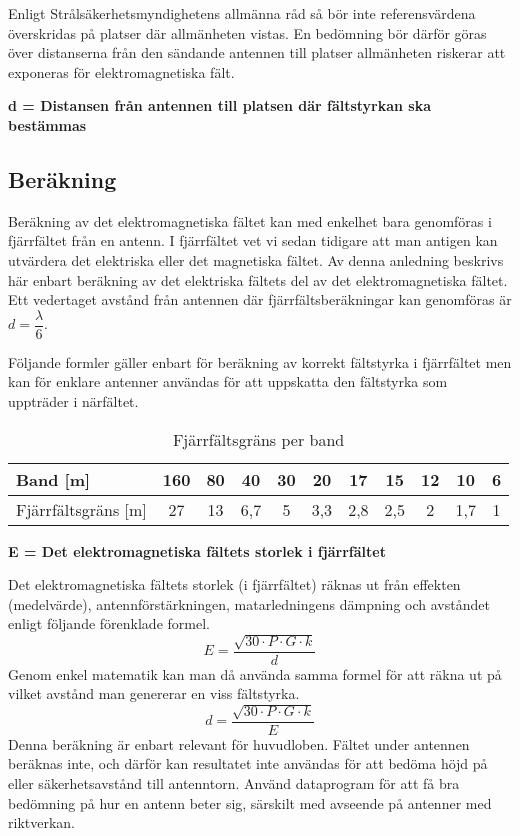 Enligt Strålsäkerhetsmyndighetens allmänna råd så bör inte referensvärdena
överskridas på platser där allmänheten vistas.
En bedömning bör därför göras över distanserna från den sändande antennen till
platser allmänheten riskerar att exponeras för elektromagnetiska fält.

\noindent\textbf{d = Distansen från antennen till platsen där fältstyrkan ska bestämmas}

\subsection{Beräkning}

Beräkning av det elektromagnetiska fältet kan med enkelhet bara
genomföras i fjärrfältet från en antenn.
I fjärrfältet vet vi sedan tidigare att man antigen kan utvärdera det
elektriska eller det magnetiska fältet.
Av denna anledning beskrivs här enbart beräkning av det elektriska fältets del av
det elektromagnetiska fältet.
Ett vedertaget avstånd från antennen där fjärrfältsberäkningar kan genomföras
är \(d=\dfrac{\lambda}{6}\).

Följande formler gäller enbart för beräkning av korrekt fältstyrka i
fjärrfältet men kan för enklare antenner användas för att uppskatta den
fältstyrka som uppträder i närfältet.

\begin{table*}[h]
  \begin{center}
    \begin{tabular}{|l|c|c|c|c|c|c|c|c|c|c|}
	\hline
	Band [m] & 160 & 80 & 40 & 30 & 20 & 17 & 15 & 12 & 10 & 6 \\ \hline
	Fjärrfältsgräns [m] & 27 & 13 & 6,7 & 5 & 3,3 & 2,8 & 2,5 & 2 & 1,7 & 1 \\ \hline
    \end{tabular}
    \caption{Fjärrfältsgräns per band}
    \label{tab:fjfltgr}
  \end{center}
\end{table*}

\noindent\textbf{E = Det elektromagnetiska fältets storlek i fjärrfältet}

Det elektromagnetiska fältets storlek (i fjärrfältet) räknas ut från
effekten (medelvärde), antennförstärkningen, matarledningens dämpning
och avståndet enligt följande förenklade formel.
\[E=\dfrac{\sqrt{30 \cdot P \cdot G \cdot k}}{d}\]
Genom enkel matematik kan man då använda samma formel för att räkna
ut på vilket avstånd man genererar en viss fältstyrka.
\[d=\dfrac{\sqrt{30 \cdot P \cdot G \cdot k}}{E}\]
Denna beräkning är enbart relevant för huvudloben.
Fältet under antennen beräknas inte, och därför kan resultatet inte användas
för att bedöma höjd på eller säkerhetsavstånd till antenntorn.
Använd dataprogram för att få bra bedömning på hur en antenn beter sig,
särskilt med avseende på antenner med riktverkan.

